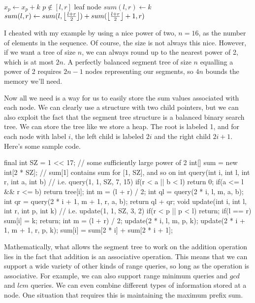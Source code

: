 \noindent \begin{minipage}{\textwidth}
\begin{algorithmic}
	\Comment $x_p \gets x_p + k$
		\Comment $p \not\in [l,r]$
		\State \Return
	\EndIf
		\Comment leaf node
		\State $sum(l,r) \gets k$
		\State \Return
	\EndIf
	\State {}
	\State {}
	\State $sum(l,r) \gets sum(l,\left\lfloor \frac{l+r}{2} \right\rfloor) + sum(\left\lfloor \frac{l+r}{2} \right\rfloor+1,r)$
\EndFunction
\end{algorithmic}
\end{minipage}

I cheated with my example by using a nice power of two, $n=16$, as the number of elements in the sequence. Of course, the size is not always this nice. However, if we want a tree of size $n$, we can always round up to the nearest power of 2, which is at most $2n$. A perfectly balanced segment tree of size $n$ equalling a power of 2 requires $2n-1$ nodes representing our segments, so $4n$ bounds the memory we'll need.

Now all we need is a way for us to easily store the sum values associated with each node. We can clearly use a structure with two child pointers, but we can also exploit the fact that the segment tree structure is a balanced binary search tree. We can store the tree like we store a heap. The root is labeled 1, and for each node with label $i$, the left child is labeled $2i$ and the right child $2i + 1$. Here's some sample code.

\begin{mylstlisting}
final int SZ = 1 << 17; // some sufficiently large power of 2
int[] sum = new int[2 * SZ]; // sum[1] contains sum for [1, SZ], and so on
int query(int i, int l, int r, int a, int b) {
	// i.e. query(1, 1, SZ, 7, 15)
	if(r < a || b < l) return 0;
	if(a <= l && r <= b) return tree[i];
	int m = (l + r) / 2;
	int ql = query(2 * i, l, m, a, b);
	int qr = query(2 * i + 1, m + 1, r, a, b);
	return ql + qr;
}
void update(int i, int l, int r, int p, int k) {
	// i.e. update(1, 1, SZ, 3, 2)
	if(r < p || p < l) return;
	if(l == r){
		sum[i] = k;
		return;
	}
	int m = (l + r) / 2;
	update(2 * i, l, m, p, k);
	update(2 * i + 1, m + 1, r, p, k);
	sum[i] = sum[2 * i] + sum[2 * i + 1];
}
\end{mylstlisting}

Mathematically, what allows the segment tree to work on the addition operation lies in the fact that addition is an associative operation. This means that we can support a wide variety of other kinds of range queries, so long as the operation is associative. For example, we can also support range minimum queries and $gcd$ and $lcm$ queries. We can even combine different types of information stored at a node. One situation that requires this is maintaining the maximum prefix sum.

